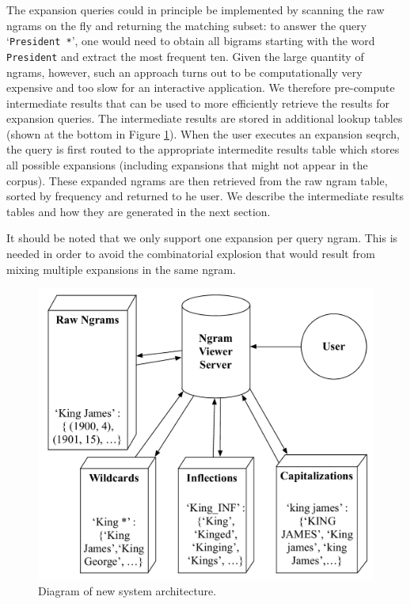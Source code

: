 \documentclass[11pt,a4paper]{article}
\newcommand{\query}[1]{\texttt{#1}}
\begin{document}
The expansion queries could in principle be implemented by scanning the raw ngrams on the fly and returning the matching subset: to answer the query `\query{President *}', one would need to obtain all bigrams starting with the word \query{President} and extract the most frequent ten. Given the large quantity of ngrams, however, such an approach turns out to be computationally very expensive and too slow for an interactive application. We therefore pre-compute intermediate results that can be used to more efficiently retrieve the results for expansion queries. The intermediate results are stored in additional lookup tables (shown at the bottom in Figure \ref{fig:architecture}). When the user executes an expansion seqrch, the query is first routed to the appropriate intermedite results table which stores all possible expansions (including expansions that might not appear in the corpus).  These expanded ngrams are then retrieved from the raw ngram table, sorted by frequency and returned to he user.
We describe the intermediate results tables and how they are generated in the next section.

It should be noted that we only support one expansion per query ngram. This is needed in order to avoid the combinatorial explosion that would result from mixing multiple expansions in the same ngram.

\begin{figure}
\includegraphics[width=\columnwidth,keepaspectratio=true]{system_architecture}
\caption{\label{fig:architecture}Diagram of new system architecture.}
\end{figure}
\end{document}
